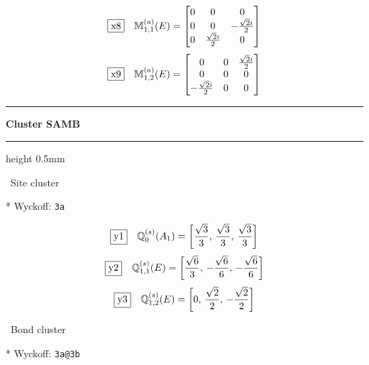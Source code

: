 \documentclass[fleqn,10pt,landscape]{jsarticle}
\begin{document}
\begin{dmath*}
\fbox{x8}\quad \mathbb{M}_{1,1}^{(a)}(E)=\begin{bmatrix} 0 & 0 & 0 \\ 0 & 0 & - \frac{\sqrt{2} i}{2} \\ 0 & \frac{\sqrt{2} i}{2} & 0 \end{bmatrix}
\end{dmath*}
\begin{dmath*}
\fbox{x9}\quad \mathbb{M}_{1,2}^{(a)}(E)=\begin{bmatrix} 0 & 0 & \frac{\sqrt{2} i}{2} \\ 0 & 0 & 0 \\ - \frac{\sqrt{2} i}{2} & 0 & 0 \end{bmatrix}
\end{dmath*}
\vspace{5mm}
\noindent \rule[0.5mm]{5mm}{0.5mm}\hspace{3mm}\textbf{Cluster SAMB}\hspace{3mm}\leaders\hrule height 0.5mm\hfill\kern0pt
\vspace{3mm}

\noindent\textbullet\, Site cluster

\vspace{5mm}

\noindent ** Wyckoff: \texttt{3a}

\begin{dmath*}
\fbox{y1}\quad \mathbb{Q}_{0}^{(s)}(A_{1})=\left[ \frac{\sqrt{3}}{3},\, \frac{\sqrt{3}}{3},\, \frac{\sqrt{3}}{3} \right]
\end{dmath*}
\begin{dmath*}
\fbox{y2}\quad \mathbb{Q}_{1,1}^{(s)}(E)=\left[ \frac{\sqrt{6}}{3},\, - \frac{\sqrt{6}}{6},\, - \frac{\sqrt{6}}{6} \right]
\end{dmath*}
\begin{dmath*}
\fbox{y3}\quad \mathbb{Q}_{1,2}^{(s)}(E)=\left[ 0,\, \frac{\sqrt{2}}{2},\, - \frac{\sqrt{2}}{2} \right]
\end{dmath*}
\vspace{5mm}

\noindent\textbullet\, Bond cluster

\vspace{5mm}

\noindent ** Wyckoff: \texttt{3a@3b}
\end{document}
